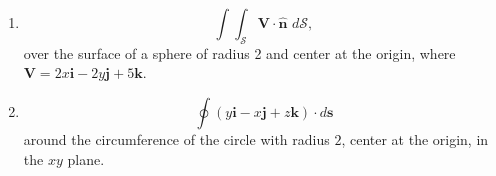 \documentclass[fleqn]{article}
\begin{document}
\begin{enumerate}
\begin{enumerate}
        \item
        \[
        \int \! \int_{\mathcal{S}}\mathbf{V\cdot \hat{n}}\,\,d\mathcal{S},
        \]
        over the surface of a sphere of radius 2 and center at the origin, where $\mathbf{V}=2x\mathbf{i}-2y\mathbf{j}+5\mathbf{k}$.
        
        \item
        \[ \oint \left( y\mathbf{i}-x\mathbf{j}+z \mathbf{k}\right) \cdot d\mathbf{s}
        \]
        around the circumference of the circle with radius $2$, center at the
        origin, in the $xy$ plane.
      \end{enumerate}
    
    
    
    
    
    
  \end{enumerate}
\end{document}
